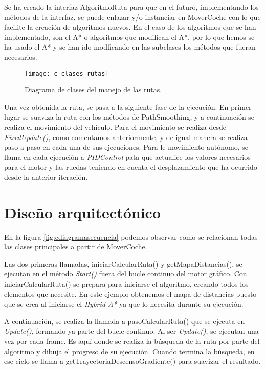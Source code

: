 Se ha creado la interfaz AlgoritmoRuta para que en el futuro, implementando los métodos de la interfaz, se puede enlazar y/o instanciar en MoverCoche con lo que facilite la creación de algoritmos nuevos. En el caso de los algoritmos que se han implementado, son el A* o algoritmos que modifican el A*, por lo que hemos se ha usado el A* y se han ido modficando en las subclases los métodos que fueran necesarios.

\begin{figure}[htpb]
    \centering
    \texttt{[image: c\_clases\_rutas]}
    \caption[Diagrama de clases del manejo de las rutas]{Diagrama de clases del manejo de las rutas.}
    \label{fig:cclasesrutas}
\end{figure}

Una vez obtenida la ruta, se pasa a la siguiente fase de la ejecución. En primer lugar se suaviza la ruta con los métodos de PathSmoothing, y a continuación se realiza el movimiento del vehículo. Para el movimiento se realiza desde \textit{FixedUpdate()}, como comentamos anteriormente, y de igual manera se realiza paso a paso en cada una de sus ejecuciones. Para le movimiento autónomo, se llama en cada ejecución a \textit{PIDControl} pata que actualice los valores necesarios para el motor y las ruedas teniendo en cuenta el desplazamiento que ha ocurrido desde la anterior iteración.

\section{Diseño arquitectónico}
En la figura \ref{fig:cdiagramasecuencia} podemos observar como se relacionan todas las clases principales a partir de MoverCoche.

Las dos primeras llamadas, iniciarCalcularRuta() y getMapaDistancias(), se ejecutan en el método \textit{Start()} fuera del bucle continuo del motor gráfico. Con iniciarCalcularRuta() se prepara para iniciarse el algoritmo, creando todos los elementos que necesite. En este ejemplo obtenemos el mapa de distancias puesto que se crea al iniciarse el \textit{Hybrid A*} ya que lo necesita durante su ejecución.

A continuación, se  realiza la llamada a pasoCalcularRuta() que se ejecuta en \textit{Update()}, formando ya parte del bucle continuo. Al ser \textit{Update()}, se ejecutan una vez por cada frame. Es aquí donde se realiza la búsqueda de la ruta por parte del algoritmo y dibuja el progreso de su ejecución. Cuando termina la búsqueda, en ese ciclo se llama a getTrayectoriaDescensoGradiente() para suavizar el resultado.


